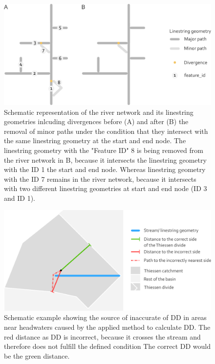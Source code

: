 \documentclass[fleqn,10pt]{wlscirep}
\begin{document}
\begin{figure}[H]

{\centering \includegraphics[width=1\linewidth]{data_descriptor/tex/divergences_scheme} 

}

\caption{Schematic representation of the river network and its linestring geometries inlcuding divergences before (A) and after (B) the removal of minor paths under the condition that they intersect with the same linestring geometry at the start and end node. The linestring geometry with the "Feature ID" 8 is being removed from the river network in B, because it intersects the linestring geometry with the ID 1 the start and end node. Whereas linestring geometry with the ID 7 remains in the river network, because it intersects with two different linestring geometries at start and end node (ID 3 and ID 1).}\label{fig:divergencescheme}
\end{figure}

\normalsize

\footnotesize

\begin{figure}[H]

{\centering \includegraphics[width=0.7\linewidth]{data_descriptor/tex/dd_inaccuracies} 

}

\caption{Schematic example showing the source of inaccurate of DD in areas near headwaters caused by the applied method to calculate DD. The red distance as DD is incorrect, because it crosses the stream and therefore does not fulfill the defined condition  The correct DD would be the green distance.}\label{fig:ddinaccuracies}
\end{figure}
\end{document}
